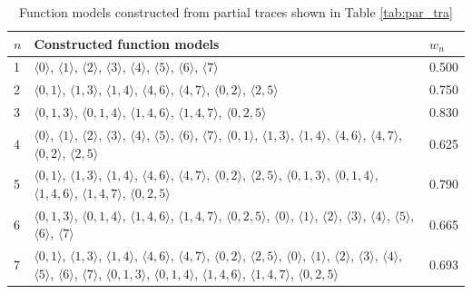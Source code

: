 \begin{table}[!ht]
\caption{Function models constructed from partial traces shown in Table \ref{tab:par_tra}}\label{tab:func_mod}
\begin{center}
{\scriptsize
\begin{tabular}{|m{0.2cm}|m{5.5cm}|m{0.5cm}|}%
  \hline
  \textbf{$n$} & \textbf{Constructed function models} & \textbf{$w_n$}\\
  \hline
  1 & $\langle 0 \rangle$, $\langle 1 \rangle$, $\langle 2 \rangle$, $\langle 3 \rangle$, $\langle4\rangle$, $\langle 5 \rangle$, $\langle 6 \rangle$, $\langle 7 \rangle$ & 0.500\\
  \hline
  2 & $\langle 0,1 \rangle$, $\langle 1,3 \rangle$, $\langle 1,4 \rangle$, $\langle 4,6 \rangle$, $\langle 4,7 \rangle$, $\langle 0,2 \rangle$, $\langle 2,5 \rangle$ & 0.750\\
  \hline
  3 & $\langle 0,1,3 \rangle$, $\langle 0,1,4 \rangle$, $\langle 1,4,6 \rangle$, $\langle 1,4,7 \rangle$, $\langle 0,2,5 \rangle$ & 0.830\\
  \hline
    4 & $\langle 0 \rangle$, $\langle 1 \rangle$, $\langle 2 \rangle$, $\langle 3 \rangle$, $\langle4\rangle$, $\langle 5 \rangle$, $\langle 6 \rangle$, $\langle 7 \rangle$, $\langle 0,1 \rangle$, $\langle 1,3 \rangle$, $\langle 1,4 \rangle$, $\langle 4,6 \rangle$, $\langle 4,7 \rangle$, $\langle 0,2 \rangle$, $\langle 2,5 \rangle$ & 0.625\\
  \hline
  5 & $\langle 0,1 \rangle$, $\langle 1,3 \rangle$, $\langle 1,4 \rangle$, $\langle 4,6 \rangle$, $\langle 4,7 \rangle$, $\langle 0,2 \rangle$, $\langle 2,5 \rangle$, $\langle 0,1,3 \rangle$, $\langle 0,1,4 \rangle$, $\langle 1,4,6 \rangle$, $\langle 1,4,7 \rangle$, $\langle 0,2,5 \rangle$ & 0.790\\
  \hline
  6 & $\langle 0,1,3 \rangle$, $\langle 0,1,4 \rangle$, $\langle 1,4,6 \rangle$, $\langle 1,4,7 \rangle$, $\langle 0,2,5 \rangle$, $\langle 0 \rangle$, $\langle 1 \rangle$, $\langle 2 \rangle$, $\langle 3 \rangle$, $\langle4\rangle$, $\langle 5 \rangle$, $\langle 6 \rangle$, $\langle 7 \rangle$ & 0.665\\
  \hline
  7 & $\langle 0,1 \rangle$, $\langle 1,3 \rangle$, $\langle 1,4 \rangle$, $\langle 4,6 \rangle$, $\langle 4,7 \rangle$, $\langle 0,2 \rangle$, $\langle 2,5 \rangle$, $\langle 0 \rangle$, $\langle 1 \rangle$, $\langle 2 \rangle$, $\langle 3 \rangle$, $\langle4\rangle$, $\langle 5 \rangle$, $\langle 6 \rangle$, $\langle 7 \rangle$, $\langle 0,1,3 \rangle$, $\langle 0,1,4 \rangle$, $\langle 1,4,6 \rangle$, $\langle 1,4,7 \rangle$, $\langle 0,2,5 \rangle$ & 0.693\\
  \hline

  \end{tabular}
}
\end{center}
\end{table}

